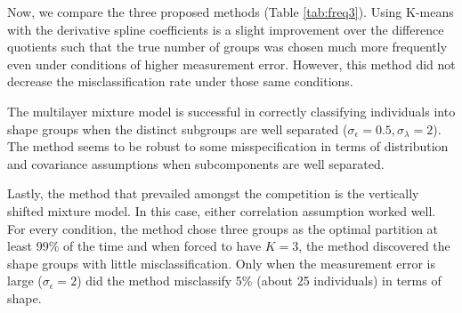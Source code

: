 Now, we compare the three proposed methods (Table \ref{tab:freq3}). Using K-means with the derivative spline coefficients is a slight improvement over the difference quotients such that the true number of groups was chosen much more frequently even under conditions of higher measurement error. However, this method did not decrease the misclassification rate under those same conditions. 

The multilayer mixture model is successful in correctly classifying individuals into shape groups when the distinct subgroups are well separated ($\sigma_{\epsilon}=0.5, \sigma_{\lambda}=2$). The method seems to be robust to some misspecification in terms of distribution and covariance assumptions when subcomponents are well separated.

Lastly, the method that prevailed amongst the competition is the vertically shifted mixture model. In this case, either correlation assumption worked well. For every condition, the method chose three groups as the optimal partition at least 99\% of the time and when forced to have $K=3$, the method discovered the shape groups with little misclassification. Only when the measurement error is large ($\sigma_{\epsilon}=2$) did the method misclassify 5\% (about 25 individuals) in terms of shape. 

